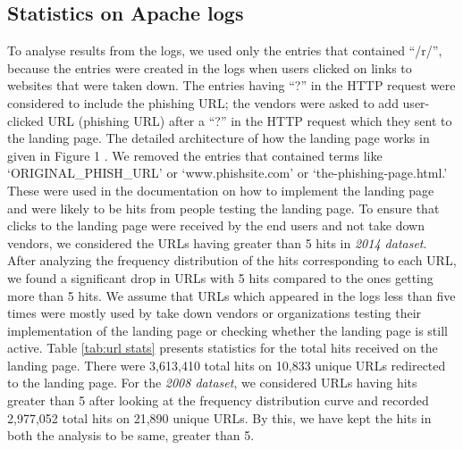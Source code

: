 \documentclass[conference]{IEEEtran}
\begin{document}
\subsection{Statistics on Apache logs}
To analyse results from the logs, we used only the entries that contained ``/r/'', because the entries were created in the logs when users clicked on links to websites that were taken down. The entries having ``?'' in the HTTP request were considered to include the phishing URL; the vendors were asked to add user-clicked URL (phishing URL) after a ``?'' in the HTTP request which they sent to the landing page. The detailed architecture of how the landing page works in given in Figure 1 \cite{pk-404}. We removed the entries that contained terms like `ORIGINAL\_PHISH\_URL' or `www.phishsite.com' or `the-phishing-page.html.' These were used in the documentation on how to implement the landing page and were likely to be hits from people testing the landing page. To ensure that clicks to the landing page were received by the end users and not take down vendors, we considered the URLs having greater than 5 hits in \textit{2014 dataset}. After analyzing the frequency distribution of the hits corresponding to each URL, we found a significant drop in URLs with 5 hits compared to the ones getting more than 5 hits. We assume that URLs which appeared in the logs less than five times were mostly used by take down vendors or organizations testing their implementation of the landing page or checking whether the landing page is still active. Table \ref{tab:url stats} presents statistics for the total hits received on the landing page. There were 3,613,410 total hits on 10,833 unique URLs redirected to the landing page. For the \textit{2008 dataset}, we considered URLs having hits greater than 5 after looking at the frequency distribution curve and recorded 2,977,052 total hits on 21,890 unique URLs. By this, we have kept the hits in both the analysis to be same, greater than 5.
\end{document}
